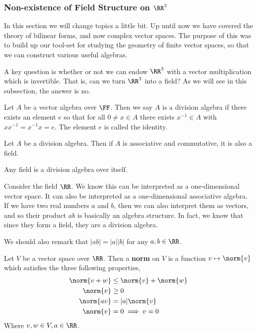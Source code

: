 \subsubsection{Non-existence of Field Structure on $\RR^3$}
In this section we will change topics a little bit. Up until now we have covered the theory of bilinear forms, and now complex vector spaces. The purpose of this was to build up our tool-set for studying the geometry of finite vector spaces, so that we can construct various useful algebras.

A key question is whether or not we can endow $\RR^3$ with a vector multiplication which is invertible. That is, can we turn $\RR^3$ into a field? As we will see in this subsection, the answer is no. 

\begin{defn}  Let $A$ be a vector algebra over $\FF$. Then we say $A$ is a division algebra if there exists an element $e$ so that for all $0\neq x\in A$ there exists $x^{-1}\in A$ with $xx^{-1}=x^{-1}x=e$. The element $e$ is called the identity.
\end{defn}
\begin{remark*}
    Let $A$ be a division algebra. Then if $A$ is associative and commutative, it is also a field.

    Any field is a division algebra over itself.
\end{remark*}
\begin{example}
    Consider the field $\RR$. We know this can be interpreted as a one-dimensional vector space. It can also be interpreted as a one-dimensional associative algebra. If we have two real numbers $a$ and $b$, then we can also interpret them as vectors, and so their product $ab$ is basically an algebra structure. In fact, we know that since they form a field, they are a division algebra.

    We should also remark that $|ab| = |a||b|$ for any $a,b\in \RR$.
\end{example}
\begin{defn}[Norm]
    Let $V$ be a vector space over $\RR$. Then a \textbf{norm} on $V$ is a function $v\mapsto \norm{v}$ which satisfies the three following properties,
\begin{align}
        \norm{v+w}&\leq \norm{v}+\norm{w}\\
        \norm{v}&\geq 0\\
        \norm{av}&=|a|\norm{v}\\
        \norm{v}&=0\implies v=0
\end{align}
Where $v,w\in V, a\in \RR$.
\end{defn}
